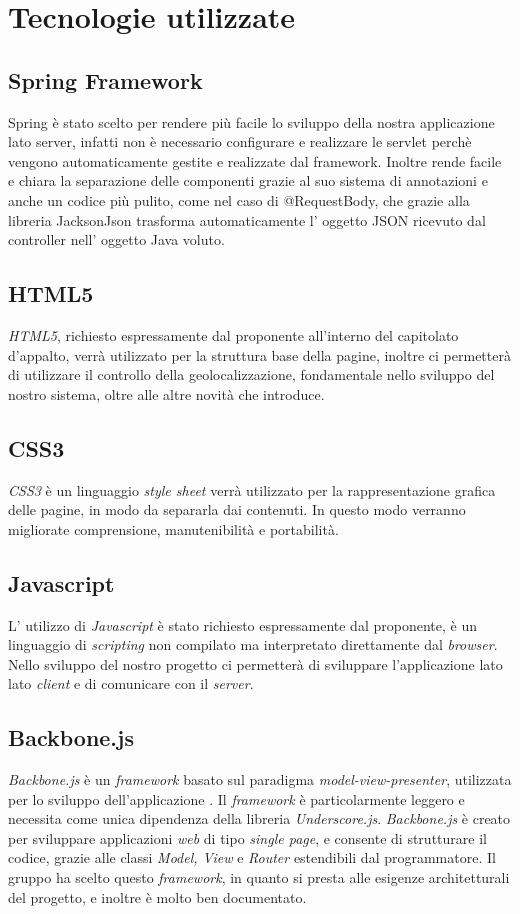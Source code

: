 \appendix
\section{Tecnologie utilizzate}
\subsection{Spring Framework}
Spring è stato scelto per rendere più facile lo sviluppo della nostra applicazione lato server, infatti non è necessario configurare e realizzare le servlet perchè vengono automaticamente gestite e realizzate dal framework. Inoltre rende facile e chiara la separazione delle componenti grazie al suo sistema di annotazioni e anche un codice più pulito, come nel caso di @RequestBody, che grazie alla libreria JacksonJson trasforma automaticamente l' oggetto JSON ricevuto dal controller nell' oggetto Java voluto.
\subsection{HTML5}
\textit{HTML5}, richiesto espressamente dal proponente all'interno del capitolato d'appalto, verrà utilizzato per la struttura base della pagine, inoltre ci permetterà di utilizzare il controllo della geolocalizzazione, fondamentale nello sviluppo del nostro sistema, oltre alle altre novità che introduce.
\subsection{CSS3}
\textit{CSS3} è un linguaggio \textit{style sheet} verrà utilizzato per la rappresentazione grafica delle pagine, in modo da separarla dai contenuti. In questo modo verranno migliorate comprensione, manutenibilità e portabilità.
\subsection{Javascript}
L' utilizzo di \textit{Javascript} è stato richiesto espressamente dal proponente, è un linguaggio di \textit{scripting} non compilato ma interpretato direttamente dal \textit{browser}. Nello sviluppo del nostro progetto ci permetterà di sviluppare l'applicazione lato lato \textit{client} e di comunicare con il \textit{server}.
\subsection{Backbone.js}
\textit{Backbone.js} è un \textit{framework} basato sul paradigma \textit{model-view-presenter}, utilizzata per lo sviluppo dell'applicazione \progetto{}.
Il \textit{framework} è particolarmente leggero e necessita come unica dipendenza della libreria \textit{Underscore.js}.
\textit{Backbone.js} è creato per sviluppare applicazioni \textit{web} di tipo \textit{single page}, e consente di strutturare il codice, grazie alle classi \textit{Model, View} e \textit{Router} estendibili dal programmatore.
Il gruppo \gruppo{} ha scelto questo \textit{framework}, in quanto si presta alle esigenze architetturali del progetto, e inoltre è molto ben documentato.

